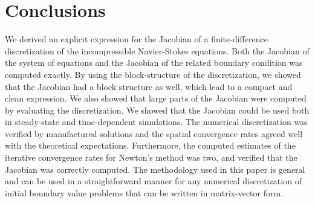 \section{Conclusions}\label{sec:conclusions}
We derived an explicit expression for the Jacobian of a finite-difference discretization of the incompressible Navier-Stokes equations. Both the Jacobian of the system of equations and the Jacobian of the related boundary condition was computed exactly. By using the block-structure of the discretization, we showed that the Jacobian had a block structure as well, which lead to a compact and clean expression. We also showed that large parts of the Jacobian were computed by evaluating the discretization.
We showed that the Jacobian could be used both in steady-state and time-dependent simulations. The numerical discretization was verified by manufactured solutions and the spatial convergence rates agreed well with the theoretical expectations. Furthermore, the computed estimates of the iterative convergence rates for Newton's method was two, and verified that the Jacobian was correctly computed.
The methodology used in this paper is general and can be used in a straightforward manner for any numerical discretization of initial boundary value problems that can be written in matrix-vector form.

